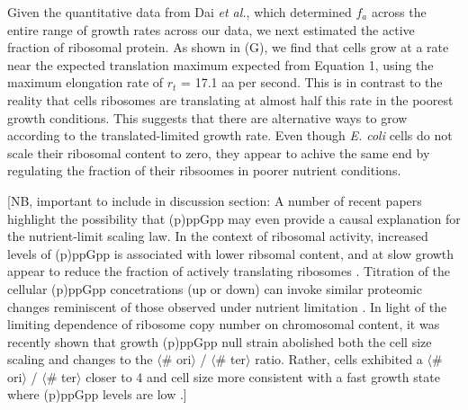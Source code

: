 Given the quantitative data from Dai \textit{et al.}, which determined $f_a$
across the entire range of growth rates across our data, we next estimated the
active fraction of ribosomal protein. As shown in (G), we
find that cells grow at a rate near the expected translation maximum expected
from Equation 1, using the maximum elongation rate of $r_t$ = 17.1 aa per
second. This is in contrast to the reality that cells ribosomes are translating
at almost half this rate in the poorest growth conditions. This suggests that
there are alternative ways to grow according to the translated-limited growth
rate. Even though \textit{E. coli} cells do not scale their ribosomal content to
zero, they appear to achive the same end by regulating the fraction of their
ribsoomes in poorer nutrient conditions.

[NB, important to include in discussion section: A number of recent papers
highlight the possibility that (p)ppGpp may even provide a causal explanation
for the nutrient-limit scaling law. In the context of ribosomal activity,
increased levels of (p)ppGpp is associated with lower ribsomal content, and at
slow growth appear to reduce the fraction of actively translating ribosomes
\citep{dai2016, dai2018}. Titration of the cellular (p)ppGpp concetrations (up
or down) can invoke similar proteomic changes reminiscent of those observed
under nutrient limitation \citep{zhu2019}. In light of the limiting dependence
of ribosome copy number on chromosomal content, it was recently shown that
growth (p)ppGpp  null strain abolished both the cell size  scaling and changes
to the  $\langle$\# ori$\rangle$ / $\langle$\# ter$\rangle$ ratio. Rather, cells
exhibited a $\langle$\# ori$\rangle$ / $\langle$\# ter$\rangle$ closer to 4 and
cell size more consistent with a fast growth state where (p)ppGpp levels are low
\citep{fernandezcoll2020}.]




